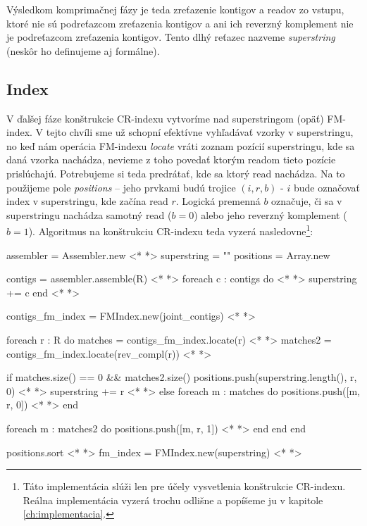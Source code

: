 Výsledkom komprimačnej fázy je teda zreťazenie kontigov a readov zo vstupu, ktoré nie sú podreťazcom zreťazenia kontigov a ani ich reverzný komplement nie je podreťazcom zreťazenia kontigov. Tento dlhý reťazec nazveme \emph{superstring} (neskôr ho definujeme aj formálne).

\subsection{Index}
\label{ssec:index}
V ďalšej fáze konštrukcie CR-indexu vytvoríme nad superstringom (opäť) FM-index. V tejto chvíli sme už schopní efektívne vyhľadávať vzorky v superstringu, no keď nám operácia FM-indexu \emph{locate} vráti zoznam pozícií superstringu, kde sa daná vzorka nachádza, nevieme z toho povedať ktorým readom tieto pozície prislúchajú. Potrebujeme si teda predrátať, kde sa ktorý read nachádza. Na to použijeme pole \emph{positions} -- jeho prvkami budú trojice $(i, r, b)$ - $i$ bude označovať index v superstringu, kde začína read $r$. Logická premenná $b$ označuje, či sa v superstringu nachádza samotný read ($b=0$) alebo jeho reverzný komplement ($b=1$). Algoritmus na konštrukciu CR-indexu teda vyzerá nasledovne\footnote{Táto implementácia slúži len pre účely vysvetlenia konštrukcie CR-indexu. Reálna implementácia vyzerá trochu odlišne a popíšeme ju v kapitole \ref{ch:implementacia}.}:

\bigskip
\begin{pseudocode}[label=lst:cr_index_construction,caption={Algoritmus konštrukcie CR-indexu nad readmi bez chýb.}]
assembler = Assembler.new <* \label{lst:cr_index_construction_assembler} *>
superstring = ""
positions = Array.new

contigs = assembler.assemble(R) <* \label{lst:cr_index_construction_assemble} *>
foreach c : contigs do <* \label{lst:cr_index_construction_contigs_start} *>
  superstring += c 
end <* \label{lst:cr_index_construction_contigs_end} *>

contigs_fm_index = FMIndex.new(joint_contigs) <* \label{lst:cr_index_construction_fm_index} *>

foreach r : R  do
  matches = contigs_fm_index.locate(r) <* \label{lst:cr_index_construction_locate} *>
  matches2 = contigs_fm_index.locate(rev_compl(r)) <* \label{lst:cr_index_construction_rev_compl} *>

  if matches.size() == 0 && matches2.size() 
    positions.push(superstring.length(), r, 0) <* \label{lst:cr_index_construction_push} *> 
    superstring += r <* \label{lst:cr_index_construction_superstring_r} *>  
  else
    foreach m : matches do
      positions.push([m, r, 0]) <* \label{lst:cr_index_construction_push2} *>  
    end
    
    foreach m : matches2 do
      positions.push([m, r, 1]) <* \label{lst:cr_index_construction_push3} *>  
    end
  end
end

positions.sort <* \label{lst:cr_index_construction_sort} *>  
fm_index = FMIndex.new(superstring) <* \label{lst:cr_index_construction_fm_index2} *>
\end{pseudocode}
\bigskip

